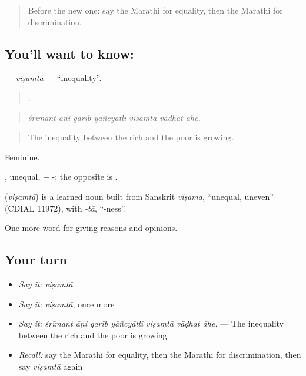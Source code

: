 \label{lesson:MR-C360-visamta}



\begin{quote}
Before the new one: say the Marathi for equality, then the Marathi for discrimination.
\end{quote}

\subsection*{You'll want to know: }
\textbf{} — \emph{viṣamtā} — \textquotedblleft{}inequality\textquotedblright{}.

\begin{quote}
      .
\end{quote}

\begin{quote}
\emph{śrīmant āṇi garīb yāñcyātlī viṣamtā vāḍhat āhe.}
\end{quote}

\begin{quote}
The inequality between the rich and the poor is growing.
\end{quote}

Feminine.

, unequal, + -; the opposite is .

\begin{cousinweb}
\textbf{} (\emph{viṣamtā}) is a learned noun built from Sanskrit \emph{viṣama}, \textquotedblleft{}unequal, uneven\textquotedblright{} (CDIAL 11972), with \emph{-tā}, \textquotedblleft{}-ness\textquotedblright{}.
\end{cousinweb}

\begin{grammarlens}[title={What you've built}]
One more word for giving reasons and opinions.
\end{grammarlens}

\subsection*{Your turn}
\begin{itemize}
\raggedright
  \item \emph{Say it:} \emph{viṣamtā}
  \item \emph{Say it:} \emph{viṣamtā}, once more
  \item \emph{Say it:} \emph{śrīmant āṇi garīb yāñcyātlī viṣamtā vāḍhat āhe.} — The inequality between the rich and the poor is growing.
  \item \emph{Recall:} say the Marathi for equality, then the Marathi for discrimination, then say \emph{viṣamtā} again
\end{itemize}


